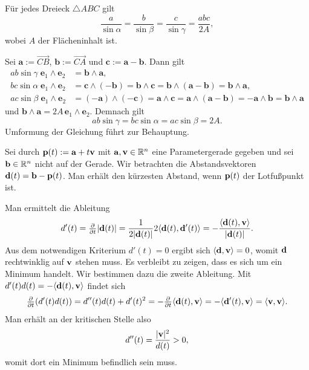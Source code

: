 \newpage
\begin{Satz}[Sinussatz]
Für jedes Dreieck $\triangle ABC$ gilt
\[\frac{a}{\sin\alpha} = \frac{b}{\sin\beta} = \frac{c}{\sin\gamma}
= \frac{abc}{2A},\]
wobei $A$ der Flächeninhalt ist.
\end{Satz}
\begin{Beweis}
Sei $\mathbf a := \overrightarrow{CB}$, $\mathbf b:= \overrightarrow{CA}$
und $\mathbf c := \mathbf a-\mathbf b$. Dann gilt
\begin{align*}
ab\sin\gamma\;\mathbf e_1\wedge\mathbf e_2 &= \mathbf b\wedge\mathbf a,\\
bc\sin\alpha\;\mathbf e_1\wedge\mathbf e_2 &= \mathbf c\wedge(-\mathbf b)
= \mathbf b\wedge\mathbf c = \mathbf b\wedge (\mathbf a-\mathbf b)
= \mathbf b\wedge\mathbf a,\\
ac\sin\beta\;\mathbf e_1\wedge\mathbf e_2 &= (-\mathbf a)\wedge (-\mathbf c)
= \mathbf a\wedge\mathbf c
= \mathbf a\wedge(\mathbf a-\mathbf b)
= -\mathbf a\wedge\mathbf b = \mathbf b\wedge\mathbf a
\end{align*}
und $\mathbf b\wedge\mathbf a = 2A\,\mathbf e_1\wedge\mathbf e_2$.
Demnach gilt
\[ab\sin\gamma = bc\sin\alpha = ac\sin\beta = 2A.\]
Umformung der Gleichung führt zur Behauptung.\;\qedsymbol
\end{Beweis}

\begin{Lemma}
Sei durch $\mathbf{p}(t):=\mathbf{a}+t\mathbf{v}$ mit $\mathbf{a},\mathbf{v}\in\mathbb R^n$
eine Parametergerade gegeben und sei $\mathbf{b}\in\mathbb R^n$ nicht auf der Gerade.
Wir betrachten die Abstandsvektoren $\mathbf{d}(t) = \mathbf{b} - \mathbf{p}(t)$. Man
erhält den kürzesten Abstand, wenn $\mathbf{p}(t)$ der Lotfußpunkt ist.
\end{Lemma}
\begin{Beweis}
Man ermittelt die Ableitung
\[d'(t) = \tfrac{\partial}{\partial t} |\mathbf{d}(t)|
= \frac{1}{2|\mathbf{d}(t)|} 2\langle\mathbf{d}(t),\mathbf{d}'(t)\rangle
= -\frac{\langle\mathbf{d}(t),\mathbf{v}\rangle}{|\mathbf{d}(t)|}.\]
Aus dem notwendigen Kriterium $d'(t)=0$ ergibt sich
$\langle\mathbf{d},\mathbf{v}\rangle = 0$, womit $\mathbf{d}$ rechtwinklig auf
$\mathbf{v}$ stehen muss. Es verbleibt zu zeigen, dass es sich um ein
Minimum handelt. Wir bestimmen dazu die zweite Ableitung.
Mit $d'(t)d(t) = -\langle\mathbf{d}(t),\mathbf{v}\rangle$ findet sich
\[\tfrac{\partial}{\partial t}(d'(t)d(t)) = d''(t)d(t) + d'(t)^2
= -\tfrac{\partial}{\partial t}\langle\mathbf{d}(t),\mathbf{v}\rangle
= -\langle\mathbf{d}'(t),\mathbf{v}\rangle = \langle\mathbf{v},\mathbf{v}\rangle.\]
Man erhält an der kritischen Stelle also
\[d''(t) = \frac{|\mathbf{v}|^2}{d(t)} > 0,\]
womit dort ein Minimum befindlich sein muss.\,\qedsymbol
\end{Beweis}

